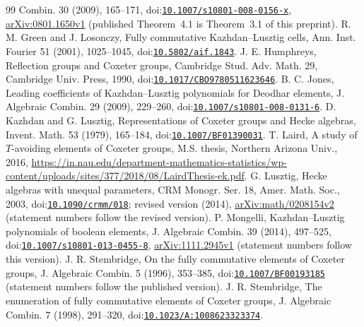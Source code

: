 \documentclass[10pt]{article}
\theoremstyle{remark}
\newcommand{\doi}[1]{doi:\href{https://doi.org/#1}{\nolinkurl{#1}}}
\begin{document}
\begin{thebibliography}{99}
Combin. 30 (2009), 165--171, \doi{10.1007/s10801-008-0156-x},
\href{https://arxiv.org/abs/0801.1650v1}{arXiv:0801.1650v1}
(published Theorem~4.1 is Theorem~3.1 of this preprint).
 R. M. Green and J. Losonczy, Fully commutative
Kazhdan--Lusztig cells, Ann. Inst. Fourier 51 (2001), 1025--1045,
\doi{10.5802/aif.1843}.
 J. E. Humphreys, Reflection groups and Coxeter groups,
Cambridge Stud. Adv. Math. 29, Cambridge Univ. Press, 1990,
\doi{10.1017/CBO9780511623646}.
 B. C. Jones, Leading coefficients of Kazhdan--Lusztig
polynomials for Deodhar elements, J. Algebraic Combin. 29 (2009), 229--260,
\doi{10.1007/s10801-008-0131-6}.
 D. Kazhdan and G. Lusztig, Representations of Coxeter groups
and Hecke algebras, Invent. Math. 53 (1979), 165--184,
\doi{10.1007/BF01390031}.
 T. Laird, A study of $T$-avoiding elements of Coxeter
groups, M.S. thesis, Northern Arizona Univ., 2016,
\url{https://in.nau.edu/department-mathematics-statistics/wp-content/uploads/sites/377/2018/08/LairdThesis-ek.pdf}.
 G. Lusztig, Hecke algebras with unequal parameters,
CRM Monogr. Ser. 18, Amer. Math. Soc., 2003, \doi{10.1090/crmm/018}; revised version (2014),
\href{https://arxiv.org/abs/math/0208154v2}{arXiv:math/0208154v2}
(statement numbers follow the revised version).
 P. Mongelli, Kazhdan--Lusztig polynomials of boolean
elements, J. Algebraic Combin. 39 (2014), 497--525,
\doi{10.1007/s10801-013-0455-8}, \href{https://arxiv.org/abs/1111.2945v1}{arXiv:1111.2945v1}
(statement numbers follow this version).
 J. R. Stembridge, On the fully commutative elements
of Coxeter groups, J. Algebraic Combin. 5 (1996), 353--385,
\doi{10.1007/BF00193185} (statement numbers follow the published version).
 J. R. Stembridge, The enumeration of fully
commutative elements of Coxeter groups, J. Algebraic Combin. 7 (1998),
291--320, \doi{10.1023/A:1008623323374}.
\end{thebibliography}
\end{document}
